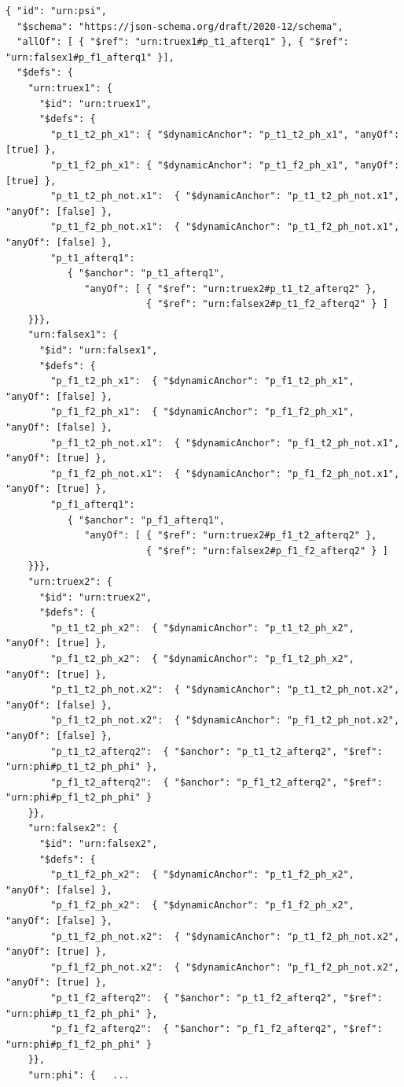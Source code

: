 \begin{toappendix}
{%
\begin{querybox}{}
\begin{lstlisting}[style=query,escapechar=Z]
{ "id": "urn:psi",
  "$schema": "https://json-schema.org/draft/2020-12/schema",
  "allOf": [ { "$ref": "urn:truex1#p_t1_afterq1" }, { "$ref": "urn:falsex1#p_f1_afterq1" }],   
  "$defs": {
    "urn:truex1": {      
      "$id": "urn:truex1",
      "$defs": {
        "p_t1_t2_ph_x1": { "$dynamicAnchor": "p_t1_t2_ph_x1", "anyOf": [true] },
        "p_t1_f2_ph_x1": { "$dynamicAnchor": "p_t1_f2_ph_x1", "anyOf": [true] },
        "p_t1_t2_ph_not.x1":  { "$dynamicAnchor": "p_t1_t2_ph_not.x1", "anyOf": [false] },
        "p_t1_f2_ph_not.x1":  { "$dynamicAnchor": "p_t1_f2_ph_not.x1", "anyOf": [false] },
        "p_t1_afterq1":
           { "$anchor": "p_t1_afterq1",
              "anyOf": [ { "$ref": "urn:truex2#p_t1_t2_afterq2" }, 
                         { "$ref": "urn:falsex2#p_t1_f2_afterq2" } ]
    }}},   
    "urn:falsex1": {             
      "$id": "urn:falsex1",
      "$defs": {
        "p_f1_t2_ph_x1":  { "$dynamicAnchor": "p_f1_t2_ph_x1", "anyOf": [false] },
        "p_f1_f2_ph_x1":  { "$dynamicAnchor": "p_f1_f2_ph_x1", "anyOf": [false] },
        "p_f1_t2_ph_not.x1":  { "$dynamicAnchor": "p_f1_t2_ph_not.x1", "anyOf": [true] },
        "p_f1_f2_ph_not.x1":  { "$dynamicAnchor": "p_f1_f2_ph_not.x1", "anyOf": [true] },
        "p_f1_afterq1":
           { "$anchor": "p_f1_afterq1",
              "anyOf": [ { "$ref": "urn:truex2#p_f1_t2_afterq2" }, 
                         { "$ref": "urn:falsex2#p_f1_f2_afterq2" } ]
    }}},    
    "urn:truex2": {      
      "$id": "urn:truex2",
      "$defs": {
        "p_t1_t2_ph_x2":  { "$dynamicAnchor": "p_t1_t2_ph_x2", "anyOf": [true] },
        "p_f1_t2_ph_x2":  { "$dynamicAnchor": "p_f1_t2_ph_x2", "anyOf": [true] },
        "p_t1_t2_ph_not.x2":  { "$dynamicAnchor": "p_t1_t2_ph_not.x2", "anyOf": [false] },
        "p_f1_t2_ph_not.x2":  { "$dynamicAnchor": "p_f1_t2_ph_not.x2", "anyOf": [false] },
        "p_t1_t2_afterq2":  { "$anchor": "p_t1_t2_afterq2", "$ref": "urn:phi#p_t1_t2_ph_phi" },
        "p_f1_t2_afterq2":  { "$anchor": "p_f1_t2_afterq2", "$ref": "urn:phi#p_f1_t2_ph_phi" }
    }},      
    "urn:falsex2": {      
      "$id": "urn:falsex2",
      "$defs": {
        "p_t1_f2_ph_x2":  { "$dynamicAnchor": "p_t1_f2_ph_x2", "anyOf": [false] },
        "p_f1_f2_ph_x2":  { "$dynamicAnchor": "p_f1_f2_ph_x2", "anyOf": [false] },
        "p_t1_f2_ph_not.x2":  { "$dynamicAnchor": "p_t1_f2_ph_not.x2", "anyOf": [true] },
        "p_f1_f2_ph_not.x2":  { "$dynamicAnchor": "p_f1_f2_ph_not.x2", "anyOf": [true] },
        "p_t1_f2_afterq2":  { "$anchor": "p_t1_f2_afterq2", "$ref": "urn:phi#p_t1_f2_ph_phi" },
        "p_f1_f2_afterq2":  { "$anchor": "p_f1_f2_afterq2", "$ref": "urn:phi#p_f1_f2_ph_phi" }
    }},      
    "urn:phi": {   ...
\end{lstlisting}
\end{querybox}


}
\end{toappendix}
